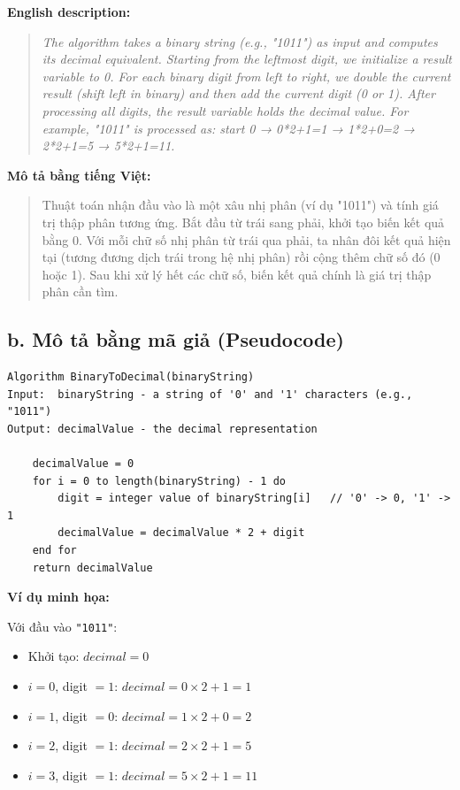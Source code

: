 \documentclass[12pt,a4paper]{article}
\begin{document}
\textbf{English description:}

\begin{quote}
\itshape
The algorithm takes a binary string (e.g., "1011") as input and computes its decimal equivalent. Starting from the leftmost digit, we initialize a result variable to 0. For each binary digit from left to right, we double the current result (shift left in binary) and then add the current digit (0 or 1). After processing all digits, the result variable holds the decimal value. For example, "1011" is processed as: start 0 → 0*2+1=1 → 1*2+0=2 → 2*2+1=5 → 5*2+1=11.
\end{quote}

\textbf{Mô tả bằng tiếng Việt:}

\begin{quote}
Thuật toán nhận đầu vào là một xâu nhị phân (ví dụ "1011") và tính giá trị thập phân tương ứng. Bắt đầu từ trái sang phải, khởi tạo biến kết quả bằng 0. Với mỗi chữ số nhị phân từ trái qua phải, ta nhân đôi kết quả hiện tại (tương đương dịch trái trong hệ nhị phân) rồi cộng thêm chữ số đó (0 hoặc 1). Sau khi xử lý hết các chữ số, biến kết quả chính là giá trị thập phân cần tìm.
\end{quote}

\subsection*{b. Mô tả bằng mã giả (Pseudocode)}

\begin{verbatim}
Algorithm BinaryToDecimal(binaryString)
Input:  binaryString - a string of '0' and '1' characters (e.g., "1011")
Output: decimalValue - the decimal representation

    decimalValue = 0
    for i = 0 to length(binaryString) - 1 do
        digit = integer value of binaryString[i]   // '0' -> 0, '1' -> 1
        decimalValue = decimalValue * 2 + digit
    end for
    return decimalValue
\end{verbatim}

\textbf{Ví dụ minh họa:}

Với đầu vào \texttt{"1011"}:

\begin{itemize}
    \item Khởi tạo: $decimal = 0$
    \item $i=0$, digit $=1$: $decimal = 0 \times 2 + 1 = 1$
    \item $i=1$, digit $=0$: $decimal = 1 \times 2 + 0 = 2$
    \item $i=2$, digit $=1$: $decimal = 2 \times 2 + 1 = 5$
    \item $i=3$, digit $=1$: $decimal = 5 \times 2 + 1 = 11$
\end{itemize}
\end{document}
